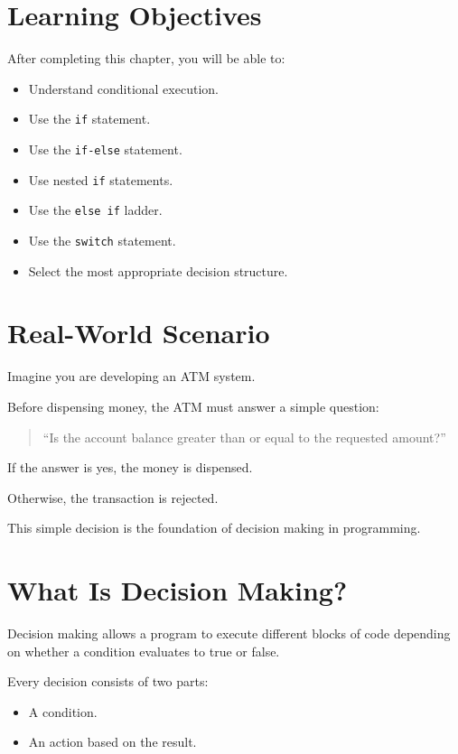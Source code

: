 \documentclass[12pt,openany]{book}
\begin{document}
\section{Learning Objectives}

After completing this chapter, you will be able to:

\begin{itemize}
    \item Understand conditional execution.
    \item Use the \texttt{if} statement.
    \item Use the \texttt{if-else} statement.
    \item Use nested \texttt{if} statements.
    \item Use the \texttt{else if} ladder.
    \item Use the \texttt{switch} statement.
    \item Select the most appropriate decision structure.
\end{itemize}

\section{Real-World Scenario}

Imagine you are developing an ATM system.

Before dispensing money, the ATM must answer a simple question:

\begin{quote}
``Is the account balance greater than or equal to the requested amount?''
\end{quote}

If the answer is yes, the money is dispensed.

Otherwise, the transaction is rejected.

This simple decision is the foundation of decision making in programming.

\section{What Is Decision Making?}

Decision making allows a program to execute different blocks of code depending on whether a condition evaluates to true or false.

Every decision consists of two parts:

\begin{itemize}
    \item A condition.
    \item An action based on the result.
\end{itemize}
\end{document}
